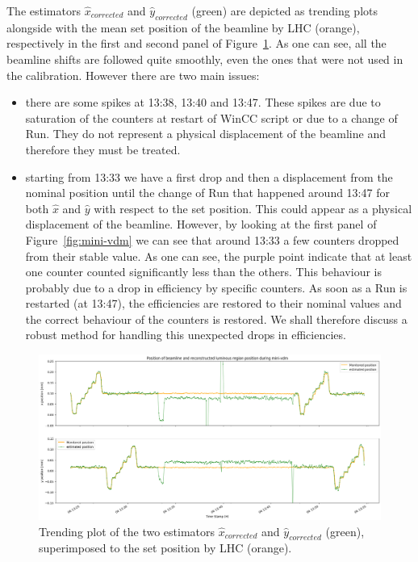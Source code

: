 The estimators $\hat{x}_{corrected}$ and $\hat{y}_{corrected}$ (green) are depicted as trending plots alongside with the mean set position of the beamline by LHC (orange), respectively in the first and second panel of Figure~\ref{fig:traceplot_outliers}. As one can see, all the beamline shifts are followed quite smoothly, even the ones that were not used in the calibration. However there are two main issues:
\begin{itemize}
    \item there are some spikes at 13:38, 13:40 and 13:47. These spikes are due to saturation of the counters at restart of WinCC script or due to a change of Run. They do not represent a physical displacement of the beamline and therefore they must be treated.
    \item starting from 13:33 we have a first drop and then a displacement from the nominal position until the change of Run that happened around 13:47 for both $\hat{x}$ and $\hat{y}$ with respect to the set position. This could appear as a physical displacement of the beamline. However, by looking at the first panel of Figure~\ref{fig:mini-vdm} we can see that around 13:33 a few counters dropped from their stable value. As one can see, the purple point indicate that at least one counter counted significantly less than the others. This behaviour is probably due to a drop in efficiency by specific counters. As soon as a Run is restarted (at 13:47), the efficiencies are restored to their nominal values and the correct behaviour of the counters is restored. We shall therefore discuss a robust method for handling this unexpected drops in efficiencies.
\end{itemize}

\begin{figure}
    \centering
    \includegraphics[width=\textwidth]{figures/traceplot_wo_median.png}
    \caption{Trending plot of the two estimators $\hat{x}_{corrected}$ and $\hat{y}_{corrected}$ (green), superimposed to the set position by LHC (orange).  }
    \label{fig:traceplot_outliers}
\end{figure}

